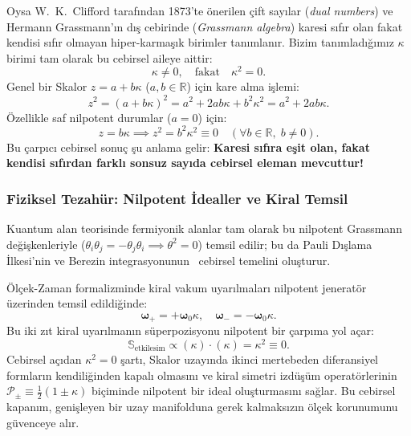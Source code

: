 \documentclass[11pt,a4paper]{article}
\begin{document}
Oysa W.~K.~Clifford tarafından 1873'te önerilen çift sayılar (\textit{dual numbers}) ve Hermann Grassmann'ın dış cebirinde (\textit{Grassmann algebra}) karesi sıfır olan fakat kendisi sıfır olmayan hiper-karmaşık birimler tanımlanır. Bizim tanımladığımız $\kappa$ birimi tam olarak bu cebirsel aileye aittir:
\begin{equation}
    \kappa \neq 0, \quad \text{fakat} \quad \kappa^2 = 0.
\end{equation}
Genel bir Skalor $z = a + b\kappa$ ($a, b \in \mathbb{R}$) için kare alma işlemi:
\begin{equation}
    z^2 = (a + b\kappa)^2 = a^2 + 2ab\kappa + b^2 \kappa^2 = a^2 + 2ab\kappa.
\end{equation}
Özellikle saf nilpotent durumlar ($a = 0$) için:
\begin{equation}
    z = b\kappa \implies z^2 = b^2 \kappa^2 \equiv 0 \quad (\forall b \in \mathbb{R}, \; b \neq 0).
\end{equation}
Bu çarpıcı cebirsel sonuç şu anlama gelir: \textbf{Karesi sıfıra eşit olan, fakat kendisi sıfırdan farklı sonsuz sayıda cebirsel eleman mevcuttur!}

\subsubsection{Fiziksel Tezahür: Nilpotent İdealler ve Kiral Temsil}
Kuantum alan teorisinde fermiyonik alanlar tam olarak bu nilpotent Grassmann değişkenleriyle ($\theta_i \theta_j = -\theta_j \theta_i \implies \theta^2 = 0$) temsil edilir; bu da Pauli Dışlama İlkesi'nin ve Berezin integrasyonunun~\cite{berezin1966} cebirsel temelini oluşturur.

Ölçek-Zaman formalizminde kiral vakum uyarılmaları nilpotent jeneratör üzerinden temsil edildiğinde:
\begin{equation}
    \boldsymbol{\omega}_+ = +\boldsymbol{\omega}_0 \kappa, \quad \boldsymbol{\omega}_- = -\boldsymbol{\omega}_0 \kappa.
\end{equation}
Bu iki zıt kiral uyarılmanın süperpozisyonu nilpotent bir çarpıma yol açar:
\begin{equation}
    \mathbb{S}_{\mathrm{etkilesim}} \propto (\kappa) \cdot (\kappa) = \kappa^2 \equiv 0.
\end{equation}
Cebirsel açıdan $\kappa^2 = 0$ şartı, Skalor uzayında ikinci mertebeden diferansiyel formların kendiliğinden kapalı olmasını ve kiral simetri izdüşüm operatörlerinin $\mathcal{P}_\pm \equiv \frac{1}{2}(1 \pm \kappa)$ biçiminde nilpotent bir ideal oluşturmasını sağlar. Bu cebirsel kapanım, genişleyen bir uzay manifolduna gerek kalmaksızın ölçek korunumunu güvenceye alır.
\end{document}
